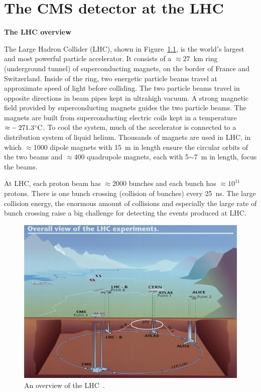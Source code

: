 \chapter{The CMS detector at the LHC}
\label{label: chapDetector}

{\bf The LHC overview}

The Large Hadron Collider (LHC), shown in
Figure~\ref{fig:LHC}, is the world$'$s largest and most powerful particle accelerator. 
It consists of a $\approx$27~km ring (underground tunnel)
 of superconducting magnets, on the border of France and Switzerland.
Inside of the ring, two energetic particle beams travel 
at approximate speed of light before colliding. 
The two particle beams travel in opposite directions in beam pipes kept in ultrahigh vacuum. 
 A strong magnetic field provided by superconducting magnets guides 
 the two particle beams. The magnets are built from 
superconducting electric coils kept in a temperature ${\approx}-271.3 ^{\circ}{\rm C}$. 
To cool the system, much of the accelerator is connected to a distribution system of liquid helium. 
Thousands of magnets are used in LHC, in which ${\approx}$1000 dipole magnets with 15~m
in length ensure the circular orbits of the two beams and $\approx$400 quadrupole magnets, each 
with 5$\sim$7~m in length, focus the beams. 

At LHC, each proton beam has ${\approx}2000$ bunches and each bunch has ${\approx}10^{11}$ protons. 
There is one bunch crossing (collision of bunches) every 25~ns.
The large collision energy, the enormous amount of collisions and 
especially the large rate of bunch crossing
raise a big challenge for detecting the events produced at LHC. 

\begin{figure}
\centering
\includegraphics[width=.9\textwidth]{figures/CERN-LHC.jpg}
\caption{An overview of the LHC~\cite{LHC}.}
\label{fig:LHC}
\end{figure}

